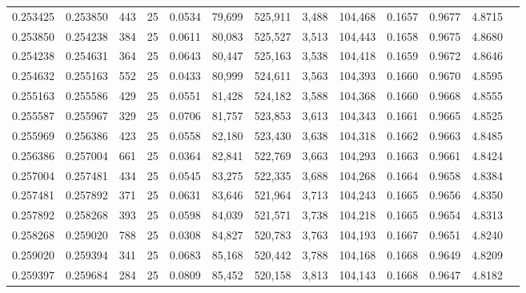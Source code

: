 \begin{tabular}{rrrrrrrrrrrrr}
0.253425 & 0.253850 &   443 &  25 &                                     0.0534 &  79,699 & 525,911 &   3,488 & 104,468 & 0.1657 & 0.9677 & 4.8715 \\
0.253850 & 0.254238 &   384 &  25 &                                     0.0611 &  80,083 & 525,527 &   3,513 & 104,443 & 0.1658 & 0.9675 & 4.8680 \\
0.254238 & 0.254631 &   364 &  25 &                                     0.0643 &  80,447 & 525,163 &   3,538 & 104,418 & 0.1659 & 0.9672 & 4.8646 \\
0.254632 & 0.255163 &   552 &  25 &                                     0.0433 &  80,999 & 524,611 &   3,563 & 104,393 & 0.1660 & 0.9670 & 4.8595 \\
0.255163 & 0.255586 &   429 &  25 &                                     0.0551 &  81,428 & 524,182 &   3,588 & 104,368 & 0.1660 & 0.9668 & 4.8555 \\
0.255587 & 0.255967 &   329 &  25 &                                     0.0706 &  81,757 & 523,853 &   3,613 & 104,343 & 0.1661 & 0.9665 & 4.8525 \\
0.255969 & 0.256386 &   423 &  25 &                                     0.0558 &  82,180 & 523,430 &   3,638 & 104,318 & 0.1662 & 0.9663 & 4.8485 \\
0.256386 & 0.257004 &   661 &  25 &                                     0.0364 &  82,841 & 522,769 &   3,663 & 104,293 & 0.1663 & 0.9661 & 4.8424 \\
0.257004 & 0.257481 &   434 &  25 &                                     0.0545 &  83,275 & 522,335 &   3,688 & 104,268 & 0.1664 & 0.9658 & 4.8384 \\
0.257481 & 0.257892 &   371 &  25 &                                     0.0631 &  83,646 & 521,964 &   3,713 & 104,243 & 0.1665 & 0.9656 & 4.8350 \\
0.257892 & 0.258268 &   393 &  25 &                                     0.0598 &  84,039 & 521,571 &   3,738 & 104,218 & 0.1665 & 0.9654 & 4.8313 \\
0.258268 & 0.259020 &   788 &  25 &                                     0.0308 &  84,827 & 520,783 &   3,763 & 104,193 & 0.1667 & 0.9651 & 4.8240 \\
0.259020 & 0.259394 &   341 &  25 &                                     0.0683 &  85,168 & 520,442 &   3,788 & 104,168 & 0.1668 & 0.9649 & 4.8209 \\
0.259397 & 0.259684 &   284 &  25 &                                     0.0809 &  85,452 & 520,158 &   3,813 & 104,143 & 0.1668 & 0.9647 & 4.8182 \\

\end{tabular}

